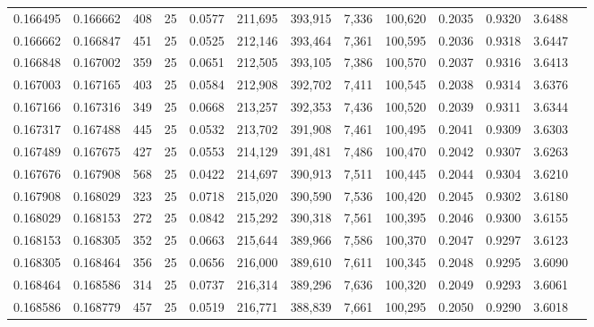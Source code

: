 \begin{tabular}{rrrrrrrrrrrrr}
0.166495 & 0.166662 &   408 &  25 &                                     0.0577 & 211,695 & 393,915 &   7,336 & 100,620 & 0.2035 & 0.9320 & 3.6488 \\
0.166662 & 0.166847 &   451 &  25 &                                     0.0525 & 212,146 & 393,464 &   7,361 & 100,595 & 0.2036 & 0.9318 & 3.6447 \\
0.166848 & 0.167002 &   359 &  25 &                                     0.0651 & 212,505 & 393,105 &   7,386 & 100,570 & 0.2037 & 0.9316 & 3.6413 \\
0.167003 & 0.167165 &   403 &  25 &                                     0.0584 & 212,908 & 392,702 &   7,411 & 100,545 & 0.2038 & 0.9314 & 3.6376 \\
0.167166 & 0.167316 &   349 &  25 &                                     0.0668 & 213,257 & 392,353 &   7,436 & 100,520 & 0.2039 & 0.9311 & 3.6344 \\
0.167317 & 0.167488 &   445 &  25 &                                     0.0532 & 213,702 & 391,908 &   7,461 & 100,495 & 0.2041 & 0.9309 & 3.6303 \\
0.167489 & 0.167675 &   427 &  25 &                                     0.0553 & 214,129 & 391,481 &   7,486 & 100,470 & 0.2042 & 0.9307 & 3.6263 \\
0.167676 & 0.167908 &   568 &  25 &                                     0.0422 & 214,697 & 390,913 &   7,511 & 100,445 & 0.2044 & 0.9304 & 3.6210 \\
0.167908 & 0.168029 &   323 &  25 &                                     0.0718 & 215,020 & 390,590 &   7,536 & 100,420 & 0.2045 & 0.9302 & 3.6180 \\
0.168029 & 0.168153 &   272 &  25 &                                     0.0842 & 215,292 & 390,318 &   7,561 & 100,395 & 0.2046 & 0.9300 & 3.6155 \\
0.168153 & 0.168305 &   352 &  25 &                                     0.0663 & 215,644 & 389,966 &   7,586 & 100,370 & 0.2047 & 0.9297 & 3.6123 \\
0.168305 & 0.168464 &   356 &  25 &                                     0.0656 & 216,000 & 389,610 &   7,611 & 100,345 & 0.2048 & 0.9295 & 3.6090 \\
0.168464 & 0.168586 &   314 &  25 &                                     0.0737 & 216,314 & 389,296 &   7,636 & 100,320 & 0.2049 & 0.9293 & 3.6061 \\
0.168586 & 0.168779 &   457 &  25 &                                     0.0519 & 216,771 & 388,839 &   7,661 & 100,295 & 0.2050 & 0.9290 & 3.6018 \\

\end{tabular}
